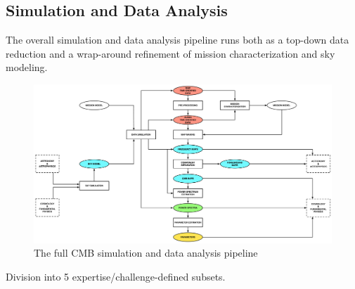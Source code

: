 \subsection{Simulation and Data Analysis}

The overall simulation and data analysis pipeline runs both as a top-down data reduction and a wrap-around refinement of mission characterization and sky modeling.

\begin{figure}[htbp]
\includegraphics[width=1\textwidth]{Analysis/simda}
\caption{The full CMB simulation and data analysis pipeline}
\label{fig_simda}
\end{figure}

Division into 5 expertise/challenge-defined subsets.

\newpage



\newpage



\newpage



\newpage



\newpage



\newpage

%



